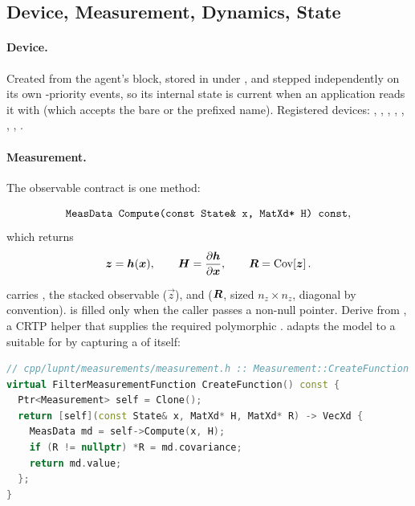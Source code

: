 \subsection{Device, Measurement, Dynamics, State}
\label{sec:sim-models}

\paragraph{Device.} Created from the agent's  block, stored in
 under , and stepped independently on
its own -priority events, so its internal state is current when an
application reads it with  (which accepts the bare or the
prefixed name). Registered devices: , , ,
, , , ,
.

\paragraph{Measurement.} The observable contract is one method:

\begin{equation}
  \label{eq:sim-meas}
  \texttt{MeasData Compute(const State\& x, MatXd* H) const},
\end{equation}
which returns
\begin{equation}
  \label{eq:sim-meas-terms}
  \bm{z} = \bm{h}(\bm{x}), \qquad
  \bm{H} = \frac{\partial \bm{h}}{\partial \bm{x}}, \qquad
  \bm{R} = \operatorname{Cov}\!\left[\bm{z}\right].
\end{equation}

 carries , the stacked observable 
($\vec{z}$), and  ($\bm{R}$, sized $n_z \times n_z$, diagonal by
convention).  is filled only when the caller passes a non-null pointer.
Derive from , a CRTP helper that supplies the
required polymorphic .  adapts the model to a
 suitable for
 by capturing a  of itself:

\begin{lstlisting}[language=cpp, caption={Adapting a measurement model to a filter.}, label={lst:sim-meas-fn}]
// cpp/lupnt/measurements/measurement.h :: Measurement::CreateFunction
virtual FilterMeasurementFunction CreateFunction() const {
  Ptr<Measurement> self = Clone();
  return [self](const State& x, MatXd* H, MatXd* R) -> VecXd {
    MeasData md = self->Compute(x, H);
    if (R != nullptr) *R = md.covariance;
    return md.value;
  };
}
\end{lstlisting}

